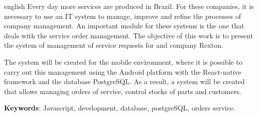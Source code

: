 \begin{resumo}[Abstract]
	\begin{otherlanguage*}{english}
Every day more services are produced in Brazil. For these companies, it is necessary to use an IT system to manage, improve and refine the processes
of company management. An important module for these systems is the one that deals with the
service order management. The objective of this work is to present the system of
management of service requests for and company Rexton.

The system will be created for the mobile environment, where it is possible to carry out this management
using the Android platform with the React-native framework and the database
PostgreSQL. As a result, a system will be created that allows managing orders of
service, control stocks of parts and customers.
		\vspace{\onelineskip}
		
		\noindent 
		\textbf{Keywords}: Javascript, development, database, postgreSQL, orders service.
	\end{otherlanguage*}
\end{resumo}
